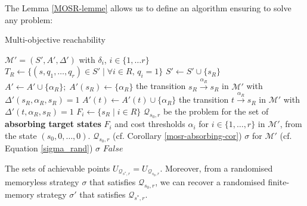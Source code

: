 The Lemma \ref{MOSR-lemme} allows us to define an algorithm ensuring to solve any \MOSR{} problem:

\begin{algorithm}[h!]
\caption{Multi-objective reachability}\label{mosr-algo}
\begin{algorithmic}[1]
 $\mathcal{M}'=(S', A', \Delta')$ with $\delta_i$, ${i \in \{1, \dots r\}}$
  \STATE $T_R \leftarrow \{ (s, q_1, \dots, q_r) \in S' \; | \; \forall i \in R,\, q_i=1 \}$
  \STATE $S' \leftarrow S' \cup \{s_R\}$
  \STATE $A' \leftarrow A' \cup \{\alpha_R\} ; \; A'(s_R) \leftarrow \{\alpha_R\}$
   the transition $s_R \xrightarrow{\alpha_R}s_R$ in $\mathcal{M'}$ with $\Delta'(s_R, \alpha_R, s_R) = 1$
\ENDFOR
{}
   \label{line-max-subset}
    \STATE $A'(t) \leftarrow A'(t) \cup \{\alpha_R\}$
     the transition $t \xrightarrow{\alpha_R}s_R$ in $\mathcal{M}'$ with $\Delta'(t, \alpha_R, s_R) = 1$
  \ENDFOR
\ENDFOR
{}
  \STATE $F_i \leftarrow \{ s_R \; | \; i \in R \}$
\ENDFOR
{} $\mathcal{Q}_{s_0, r}$ be the \MOSR{} problem for the set of \textbf{absorbing target states} $F_i$ and cost thresholds $\alpha_i$ for $i \in \{1, \dots, r\}$ in $\mathcal{M}'$, from the state $(s_0, 0, \dots, 0)$.
 $\mathcal{Q}_{s_0, r}$ (cf. Corollary \ref{mosr-absorbing-cor})
   $\sigma$ for $\mathcal{M}'$ (cf. Equation \ref{sigma_rand})
  \RETURN $\sigma$
\ELSE
  \RETURN $False$
\ENDIF
\end{algorithmic}
\end{algorithm}

\begin{lemma}
  The sets of achievable points $U_{\mathcal{Q}_{s^*, r}} = U_{\mathcal{Q}_{s_0, r}}$. Moreover, from a randomised memoryless strategy $\sigma$ that satisfies $\mathcal{Q}_{s_0, r}$, we can recover a randomised finite-memory strategy $\sigma'$ that satisfies $\mathcal{Q}_{s^*, r}$.
\end{lemma}

